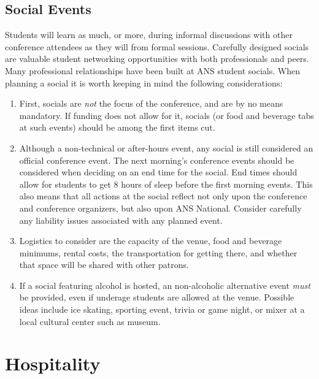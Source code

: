 \documentclass[12pt]{article}
\begin{document}
\subsection{Social Events}
Students will learn as much, or more, during informal discussions with other conference attendees as they will from formal sessions.
Carefully designed socials are valuable student networking opportunities with both professionals and peers.
Many professional relationships have been built at ANS student socials.
When planning a social it is worth keeping in mind the following considerations:
\begin{enumerate}
    \item First, socials are \emph{not} the focus of the conference, and are by no means mandatory. If funding does not allow for it, socials (or food and beverage tabs at such events) should be among the first items cut.
    \item Although a non-technical or after-hours event, any social is still considered an official conference event. The next morning's conference events should be considered when deciding on an end time for the social. End times should allow for students to get 8 hours of sleep before the first morning events. This also means that all actions at the social reflect not only upon the conference and conference organizers, but also upon ANS National. Consider carefully any liability issues associated with any planned event.
    \item Logistics to consider are the capacity of the venue, food and beverage minimums, rental costs, the transportation for getting there, and whether that space will be shared with other patrons.
    \item If a social featuring alcohol is hosted, an non-alcoholic alternative event \emph{must} be provided, even if underage students are allowed at the venue. Possible ideas include ice skating, sporting event, trivia or game night, or mixer at a local cultural center such as museum.
\end{enumerate}


\clearpage
\section{Hospitality}
\end{document}
